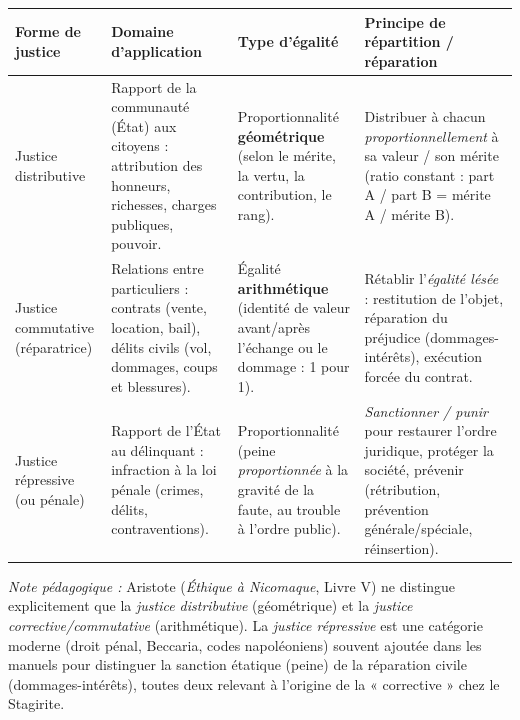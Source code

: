 \documentclass[11pt]{article}
\newcounter{popsec}
\newcounter{popsub}
\newcommand{\courssub}[1]{%
  \stepcounter{popsub}%
  \par\vspace{9pt}\noindent{\popxbold\fontsize{11.5}{13}\selectfont\color{popink}{\color{poporange}\thepopsec.\thepopsub}\hspace{6pt}#1}\par\nopagebreak\vspace{4pt}
}
\begin{document}
\begin{corrige}
\begin{center}
\begin{tabularx}{\linewidth}{|l|X|X|X|}
\hline
\rowcolor{popblueL}
\textbf{Forme de justice} & \textbf{Domaine d'application} & \textbf{Type d'égalité} & \textbf{Principe de répartition / réparation} \\
\hline
Justice distributive & Rapport de la communauté (État) aux citoyens : attribution des honneurs, richesses, charges publiques, pouvoir. & Proportionnalité \textbf{géométrique} (selon le mérite, la vertu, la contribution, le rang). & Distribuer à chacun \emph{proportionnellement} à sa valeur / son mérite (ratio constant : part A / part B = mérite A / mérite B). \\
\hline
Justice commutative (réparatrice) & Relations entre particuliers : contrats (vente, location, bail), délits civils (vol, dommages, coups et blessures). & Égalité \textbf{arithmétique} (identité de valeur avant/après l'échange ou le dommage : 1 pour 1). & Rétablir l'\emph{égalité lésée} : restitution de l'objet, réparation du préjudice (dommages-intérêts), exécution forcée du contrat. \\
\hline
Justice répressive (ou pénale) & Rapport de l'État au délinquant : infraction à la loi pénale (crimes, délits, contraventions). & Proportionnalité (peine \emph{proportionnée} à la gravité de la faute, au trouble à l'ordre public). & \emph{Sanctionner / punir} pour restaurer l'ordre juridique, protéger la société, prévenir (rétribution, prévention générale/spéciale, réinsertion). \\
\hline
\end{tabularx}
\end{center}
\emph{Note pédagogique :} Aristote (\emph{Éthique à Nicomaque}, Livre V) ne distingue explicitement que la \emph{justice distributive} (géométrique) et la \emph{justice corrective/commutative} (arithmétique). La \emph{justice répressive} est une catégorie moderne (droit pénal, Beccaria, codes napoléoniens) souvent ajoutée dans les manuels pour distinguer la sanction étatique (peine) de la réparation civile (dommages-intérêts), toutes deux relevant à l'origine de la « corrective » chez le Stagirite.
\end{corrige}

\courssub{Je me prépare au Bac}
\end{document}

